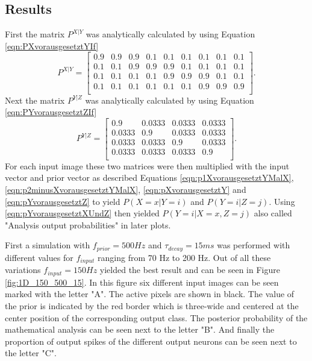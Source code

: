\subsection{Results}

First the matrix $P^{X|Y}$ was analytically calculated by using Equation \ref{eqn:PXvorausgesetztYIf} 
\begin{equation}
\label{eqn:pXvorausgesetztYResult}
P^{X|Y} = \begin{bmatrix}
0.9 & 0.9 & 0.9 & 0.1 & 0.1 & 0.1 & 0.1 & 0.1 & 0.1\\
0.1 & 0.1 & 0.9 & 0.9 & 0.9 & 0.1 & 0.1 & 0.1 & 0.1\\
0.1 & 0.1 & 0.1 & 0.1 & 0.9 & 0.9 & 0.9 & 0.1 & 0.1\\
0.1 & 0.1 & 0.1 & 0.1 & 0.1 & 0.1 & 0.9 & 0.9 & 0.9\\
\end{bmatrix}.
\end{equation}
Next the matrix $P^{Y|Z}$ was analytically calculated by using Equation \ref{eqn:PYvorausgesetztZIf} 
\begin{equation}
\label{eqn:pYvorausgesetztZResult}
P^{Y|Z} = \begin{bmatrix}
0.9 & 0.0333 & 0.0333 & 0.0333\\
0.0333 & 0.9 & 0.0333 & 0.0333\\
0.0333 & 0.0333 & 0.9 & 0.0333\\
0.0333 & 0.0333 & 0.0333 & 0.9\\
\end{bmatrix}.
\end{equation} 
For each input image these two matrices were then  multiplied with the input vector and prior vector as described Equations \ref{eqn:p1XvorausgesetztYMalX}, \ref{eqn:p2minusXvorausgesetztYMalX},  \ref{eqn:pXvorausgesetztY} and \ref{eqn:pYvorausgesetztZ} to yield $P(X = x|Y = i)$ and $P(Y=i|Z=j)$. Using  \ref{eqn:pYvorausgesetztXUndZ} then 
yielded $P(Y = i|X = x, Z = j)$ also called "Analysis output probabilities" in later plots.

First a simulation with $f_{prior} = 500 Hz$ and $\tau_{decay} = 15 ms$ was performed with different values for $f_{input}$ ranging from 70 Hz to 200 Hz. Out of all these variations $f_{input} = 150 Hz$ yielded the best result and can be seen in Figure \ref{fig:1D_150_500_15}. In this figure six different input images can be seen marked with the letter "A". The active pixels are shown in black. The value of the prior is indicated by the red border which is three-wide and centered at the center position of the corresponding output class. The posterior probability of the mathematical analysis can be seen next to the letter "B". And finally the proportion of output spikes of the different output neurons can be seen next to the letter "C".

